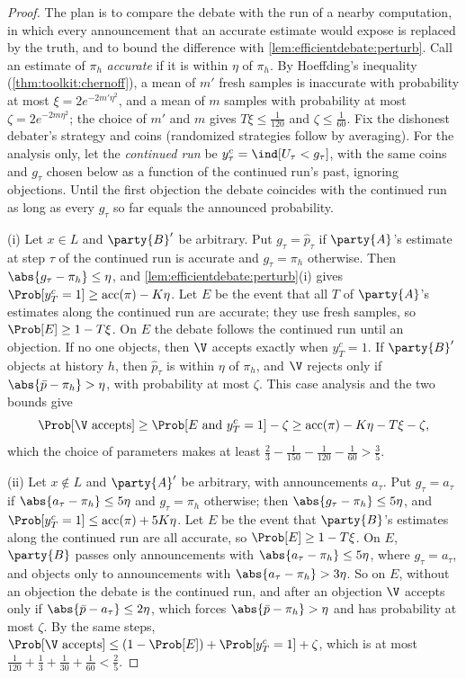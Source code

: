 \begin{refsection}
\begin{proof}
The plan is to compare the debate with the run of a nearby computation, in which every announcement that an accurate estimate would expose is replaced by the truth, and to bound the difference with \cref{lem:efficientdebate:perturb}. Call an estimate of $\pi_h$ \emph{accurate} if it is within $\eta$ of $\pi_h$. By Hoeffding's inequality (\cref{thm:toolkit:chernoff}), a mean of $m'$ fresh samples is inaccurate with probability at most $\xi=2e^{-2m'\eta^2}$, and a mean of $m$ samples with probability at most $\zeta=2e^{-2m\eta^2}$; the choice of $m'$ and $m$ gives $T\xi\le\frac1{120}$ and $\zeta\le\frac1{60}$. Fix the dishonest debater's strategy and coins (randomized strategies follow by averaging). For the analysis only, let the \emph{continued run} be $y^c_\tau=\ind[U_\tau<g_\tau]$, with the same coins and $g_\tau$ chosen below as a function of the continued run's past, ignoring objections. Until the first objection the debate coincides with the continued run as long as every $g_\tau$ so far equals the announced probability.

(i) Let $x\in L$ and $\party{B}'$ be arbitrary. Put $g_\tau=\hat p_\tau$ if $\party{A}$'s estimate at step $\tau$ of the continued run is accurate and $g_\tau=\pi_h$ otherwise. Then $\abs{g_\tau-\pi_h}\le\eta$, and \cref{lem:efficientdebate:perturb}(i) gives $\Prob[y^c_T=1]\ge\efficientdebateacc(\pi)-K\eta$. Let $E$ be the event that all $T$ of $\party{A}$'s estimates along the continued run are accurate; they use fresh samples, so $\Prob[E]\ge1-T\xi$. On $E$ the debate follows the continued run until an objection. If no one objects, then $\V$ accepts exactly when $y^c_T=1$. If $\party{B}'$ objects at history $h$, then $\hat p_\tau$ is within $\eta$ of $\pi_h$, and $\V$ rejects only if $\abs{\bar p-\pi_h}>\eta$, with probability at most $\zeta$. This case analysis and the two bounds give
\[
\Prob[\V\text{ accepts}]\ge\Prob[E\text{ and }y^c_T=1]-\zeta\ge\efficientdebateacc(\pi)-K\eta-T\xi-\zeta,
\]
which the choice of parameters makes at least $\frac23-\frac1{150}-\frac1{120}-\frac1{60}>\frac35$.

(ii) Let $x\notin L$ and $\party{A}'$ be arbitrary, with announcements $a_\tau$. Put $g_\tau=a_\tau$ if $\abs{a_\tau-\pi_h}\le5\eta$ and $g_\tau=\pi_h$ otherwise; then $\abs{g_\tau-\pi_h}\le5\eta$, and $\Prob[y^c_T=1]\le\efficientdebateacc(\pi)+5K\eta$. Let $E$ be the event that $\party{B}$'s estimates along the continued run are all accurate, so $\Prob[E]\ge1-T\xi$. On $E$, $\party{B}$ passes only announcements with $\abs{a_\tau-\pi_h}\le5\eta$, where $g_\tau=a_\tau$, and objects only to announcements with $\abs{a_\tau-\pi_h}>3\eta$. So on $E$, without an objection the debate is the continued run, and after an objection $\V$ accepts only if $\abs{\bar p-a_\tau}\le2\eta$, which forces $\abs{\bar p-\pi_h}>\eta$ and has probability at most $\zeta$. By the same steps, $\Prob[\V\text{ accepts}]\le(1-\Prob[E])+\Prob[y^c_T=1]+\zeta$, which is at most $\frac1{120}+\frac13+\frac1{30}+\frac1{60}<\frac25$.


\end{proof}
\end{refsection}

